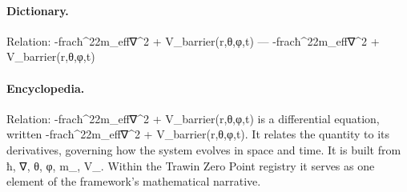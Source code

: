 \paragraph{Dictionary.}
Relation: -fracħ\textasciicircum{}22m\_eff∇\textasciicircum{}2 + V\_barrier(r,θ,φ,t) — -fracħ\textasciicircum{}22m\_eff∇\textasciicircum{}2 + V\_barrier(r,θ,φ,t)

\paragraph{Encyclopedia.}
Relation: -fracħ\textasciicircum{}22m\_eff∇\textasciicircum{}2 + V\_barrier(r,θ,φ,t) is a differential equation, written -fracħ\textasciicircum{}22m\_eff∇\textasciicircum{}2 + V\_barrier(r,θ,φ,t). It relates the quantity to its derivatives, governing how the system evolves in space and time. It is built from ħ, ∇, θ, φ, m\_, V\_. Within the Trawin Zero Point registry it serves as one element of the framework's mathematical narrative.
